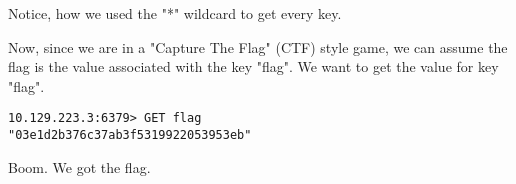 \documentclass[conference]{IEEEtran}
\begin{document}
Notice, how we used the "*" wildcard to get every key.

Now, since we are in a "Capture The Flag" (CTF) style game, we can assume the flag is the value associated with the key "flag". We want to get the value for key "flag".

\begin{scriptsize}
\begin{verbatim}
10.129.223.3:6379> GET flag
"03e1d2b376c37ab3f5319922053953eb"
\end{verbatim}
\end{scriptsize}

Boom. We got the flag.
\end{document}
